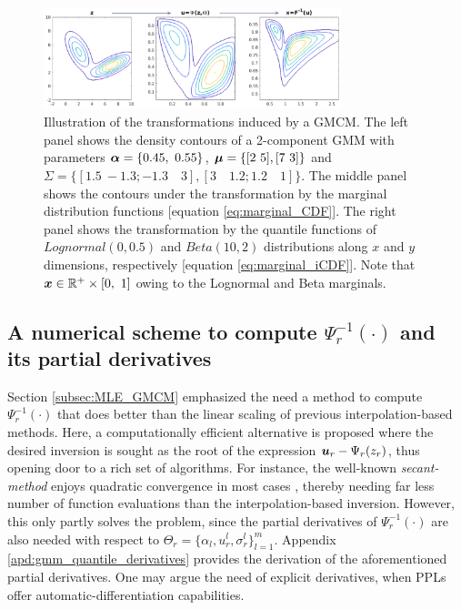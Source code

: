 \documentclass{article}
\begin{document}
 

\begin{figure}[ht]
\centering
\includegraphics[width= 245pt]{figures/figure_gmcm_transformation}
\caption{Illustration of the transformations induced by a GMCM. The left panel shows the density contours of a 2-component GMM with parameters $\bs{\alpha} = \{0.45, \ 0.55\}$, $\boldsymbol{\mu} =\{[2 \ 5], [7 \ 3] \}$ and  $ \Sigma= \{[1.5 \  -1.3 ; -1.3 \quad 3 ],[3 \quad 1.2 ; 1.2 \quad 1] \}$. The middle panel shows the contours under the transformation by the marginal distribution functions [equation \eqref{eq:marginal_CDF}]. The right panel shows the transformation  by the quantile functions of $Lognormal(0,0.5)$ and $Beta(10,2)$ distributions along $x$ and $y$ dimensions, respectively [equation \eqref{eq:marginal_iCDF}]. Note that $\boldsymbol{x}\in \mathbb{R}^+\times [0,\ 1]$ owing to the Lognormal and Beta marginals.}

\label{fig:gmcm_transformation}
\end{figure}
\subsection{A numerical scheme to compute $\Psi^{-1}_r(\cdot)$ and its partial derivatives} 
Section \ref{subsec:MLE_GMCM} emphasized the need a method to compute $\Psi^{-1}_r(\cdot)$ that does better than the linear scaling of previous interpolation-based methods. Here, a computationally efficient alternative is proposed where the desired inversion is sought as the root of the expression $\boldsymbol{u}_r-\Psi_r(z_r)$, thus opening door to a rich set of algorithms. For instance, the well-known \emph{secant-method} enjoys quadratic convergence in most cases \citep{diez2003}, thereby needing far less number of function evaluations than the interpolation-based inversion. However, this only partly solves the problem, since the partial derivatives of $\Psi^{-1}_r(\cdot)$ are also needed with respect to $\Theta_r=\{\alpha_l,u_r^l,\sigma_r^l\}_{l=1}^m$. Appendix \ref{apd:gmm_quantile_derivatives} provides the derivation of the aforementioned partial derivatives. One may argue the need of explicit derivatives, when PPLs offer automatic-differentiation capabilities. 
\end{document}
